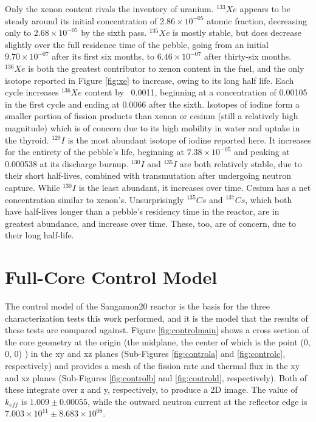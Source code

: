 Only the xenon content rivals the inventory of uranium.  $^{133}Xe$ appears to be steady around its initial concentration of $2.86\times10^{-05}$ atomic fraction, decreasing only to $2.68\times10^{-05}$ by the sixth pass.  $^{135}Xe$ is mostly stable, but does decrease slightly over the full residence time of the pebble, going from an initial $9.70\times10^{-07}$ after its first six months, to  $6.46\times10^{-07}$ after thirty-six months.  $^{136}Xe$ is both the greatest contributor to xenon content in the fuel, and the only isotope reported in  Figure \ref{fig:xe} to increase, owing to its long half life.  Each cycle increases $^{136}Xe$ content by ~0.0011, beginning at a concentration of 0.00105 in the first cycle and ending at 0.0066 after the sixth.  Isotopes of iodine form a smaller portion of fission products than xenon or cesium (still a relatively high magnitude) which is of concern due to its high mobility in water and uptake in the thyroid.  $^{129}I$ is the most abundant isotope of iodine reported here.  It increases for the entirety of the pebble's life, beginning at $7.38\times10^{-05}$ and peaking at 0.000538 at its discharge burnup.  $^{130}I$ and $^{135}I$ are both relatively stable, due to their short half-lives, combined with transmutation after undergoing neutron capture.  While $^{130}I$ is the least abundant, it increases over time.  Cesium has a net concentration similar to xenon's.  Unsurprisingly $^{135}Cs$ and $^{137}Cs$, which both have half-lives longer than a pebble's residency time in the reactor, are in greatest abundance, and increase over time.  These, too, are of concern, due to their long half-life.

\section{Full-Core Control Model}
\label{res-control}

The control model of the Sangamon20 reactor is the basis for the three characterization tests this work performed, and it is the model that the results of these tests are compared against.  Figure \ref{fig:controlmain} shows a cross section of the core geometry at the origin (the midplane, the center of which is the point (0, 0, 0) ) in the xy and xz planes (Sub-Figures \ref{fig:controla} and \ref{fig:controlc}, respectively) and provides a mesh of the fission rate and thermal flux in the xy and xz planes (Sub-Figures \ref{fig:controlb} and \ref{fig:controld}, respectively).  Both of these integrate over z and y, respectively, to produce a 2D image.  The value of $k_{eff}$ is $1.009 \pm 0.00055$, while the outward neutron current at the reflector edge is $7.003\times 10^{11} \pm 8.683\times 10^{08}$.

